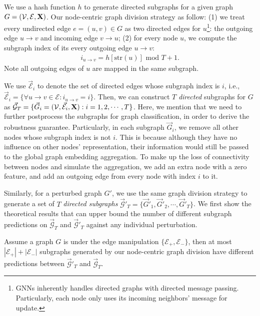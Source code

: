 We use a hash function $h$ to generate directed subgraphs for a given graph $G=(\mathcal{V},\mathcal{E},{\bf X})$. 
Our node-centric graph division strategy as follow: (1) we treat every undirected edge $e=(u,v) \in G$ as two directed edges for $u$\footnote{GNNs inherently handles directed graphs with directed message passing. Particularly, each node only uses its incoming neighbors' message for update.}: the outgoing edge $u \rightarrow v$ and incoming edge $v \rightarrow u$; (2) for every node $u$, we compute the subgraph index of its every outgoing edge $u \rightarrow v$: 
\begin{align}
\label{eqn:nodehash}
i_{u \rightarrow v} = h[\mathrm{str}(u)] \, \, \mathrm{mod} \, \, T+1. 
\end{align}
Note all outgoing edges of $u$ are mapped in the same subgraph.

We use $\vec{\mathcal{E}}_i$ to denote the set of directed edges whose subgraph index is $i$, i.e., $\vec{\mathcal{E}}_i = \{\forall u \rightarrow v \in {\mathcal{E}}: i_{u \rightarrow v}= i \}.$ 
Then, we can construct $T$ \emph{directed} subgraphs for $G$ as $\vec{\mathcal{G}}_T = \{ \vec{G}_i = (\mathcal{V},\vec{\mathcal{E}}_i,{\bf X}): i=1,2,\cdots, T\}$. 
{Here, we mention that we need to further postprocess the subgraphs for graph classification, in order to derive the robustness guarantee. 
Particularly, in each subgraph $\vec{G}_i$, we remove all other nodes whose subgraph index is not $i$. This is because although they have no influence on other nodes' representation, their information would still be passed to the global graph embedding aggregation. To make up the loss of connectivity between nodes and simulate the aggregation, we add an extra node with a zero feature, and add an outgoing edge from every node with index $i$ to it.}




\vspace{+0.05in}
Similarly, for a perturbed graph ${G}'$, we use the same graph division strategy to generate a set of $T$ \emph{directed subgraphs} $\vec{\mathcal{G}}'_T = \{\vec{G}'_1, \vec{G}'_2, \cdots, \vec{G}'_T\}$. 
We first show the theoretical results that can upper bound the number of different subgraph predictions on $\vec{\mathcal{G}}_T$ and $\vec{\mathcal{G}}'_T$ against any individual perturbation. 


\begin{theorem}[]
\label{thm:edgeperturb2}
Assume a graph $G$ is under the edge manipulation $\{\mathcal{E}_+,\mathcal{E}_-\}$, 
then at most $|\mathcal{E}_+| + |\mathcal{E}_-|$ subgraphs generated by our node-centric graph division have different predictions between $\vec{\mathcal{G}}'_T$ and $\vec{\mathcal{G}}_T$.  
\end{theorem}

